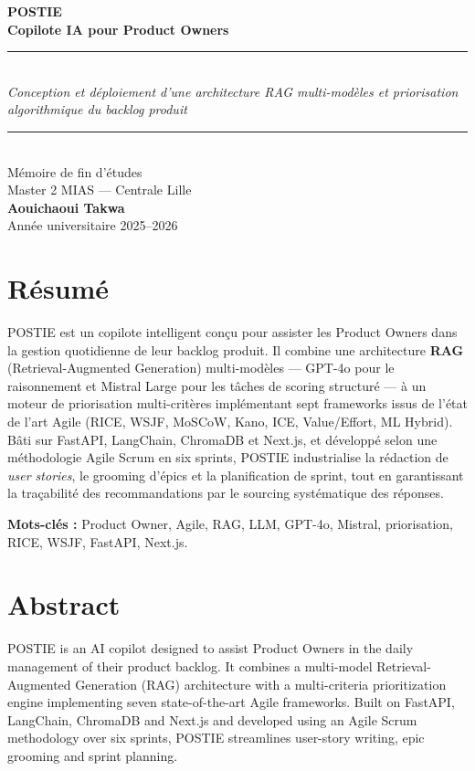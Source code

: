 \documentclass[12pt,a4paper,oneside]{report}
\begin{document}
\begin{titlepage}\centering
\vspace*{2cm}
{\Huge\bfseries\color{postieblue} POSTIE}\\[0.6em]
{\Large\bfseries Copilote IA pour Product Owners}\\[3em]
\rule{0.6\textwidth}{0.5pt}\\[1em]
{\Large\itshape Conception et déploiement d'une architecture RAG
multi-modèles et priorisation algorithmique du backlog produit}\\[1em]
\rule{0.6\textwidth}{0.5pt}\\[4em]
{\large Mémoire de fin d'études}\\[0.5em]
{\large Master 2 MIAS --- Centrale Lille}\\[3em]
{\large\bfseries Aouichaoui Takwa}\\[2em]
\vfill
{\large Année universitaire 2025--2026}
\end{titlepage}

\chapter*{Résumé}
POSTIE est un copilote intelligent conçu pour assister les Product
Owners dans la gestion quotidienne de leur backlog produit. Il combine
une architecture \textbf{RAG} (Retrieval-Augmented Generation)
multi-modèles --- GPT-4o pour le raisonnement et Mistral Large pour les
tâches de scoring structuré --- à un moteur de priorisation
multi-critères implémentant sept frameworks issus de l'état de l'art
Agile (RICE, WSJF, MoSCoW, Kano, ICE, Value/Effort, ML Hybrid). Bâti
sur FastAPI, LangChain, ChromaDB et Next.js, et développé selon une
méthodologie Agile Scrum en six sprints, POSTIE industrialise la
rédaction de \textit{user stories}, le grooming d'épics et la
planification de sprint, tout en garantissant la traçabilité des
recommandations par le sourcing systématique des réponses.

\vspace{1em}\noindent\textbf{Mots-clés :} Product Owner, Agile, RAG,
LLM, GPT-4o, Mistral, priorisation, RICE, WSJF, FastAPI, Next.js.

\chapter*{Abstract}
POSTIE is an AI copilot designed to assist Product Owners in the daily
management of their product backlog. It combines a multi-model
Retrieval-Augmented Generation (RAG) architecture with a multi-criteria
prioritization engine implementing seven state-of-the-art Agile
frameworks. Built on FastAPI, LangChain, ChromaDB and Next.js and
developed using an Agile Scrum methodology over six sprints, POSTIE
streamlines user-story writing, epic grooming and sprint planning.
\end{document}
